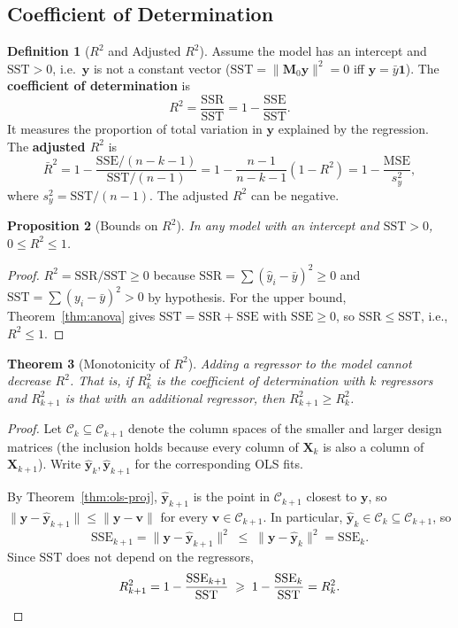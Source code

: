 \documentclass[14pt]{extarticle}
\theoremstyle{plain}
\newtheorem{theorem}{Theorem}[section]
\newtheorem{proposition}[theorem]{Proposition}
\theoremstyle{definition}
\newtheorem{definition}[theorem]{Definition}
\theoremstyle{remark}
\newcommand{\SST}{\mathrm{SST}}
\newcommand{\SSR}{\mathrm{SSR}}
\newcommand{\SSE}{\mathrm{SSE}}
\newcommand{\MSE}{\mathrm{MSE}}
\newcommand{\bX}{\mathbf{X}}
\newcommand{\by}{\mathbf{y}}
\newcommand{\bM}{\mathbf{M}}
\newcommand{\bone}{\mathbf{1}}
\newcommand{\bv}{\mathbf{v}}
\newcommand{\calC}{\mathcal{C}}
\begin{document}
\subsection{Coefficient of Determination}

\begin{definition}[$R^2$ and Adjusted $R^2$]\label{def:R2}
Assume the model has an intercept and $\SST > 0$, i.e.\ $\by$ is not a constant vector ($\SST = \|\bM_0\by\|^2 = 0$ iff $\by = \bar y\bone$). The \textbf{coefficient of determination} is
\begin{equation}
R^2 = \frac{\SSR}{\SST} = 1 - \frac{\SSE}{\SST}.
\end{equation}
It measures the proportion of total variation in $\by$ explained by the regression. The \textbf{adjusted $R^2$} is
\begin{equation}
\bar{R}^2 = 1 - \frac{\SSE/(n-k-1)}{\SST/(n-1)} = 1 - \frac{n-1}{n-k-1}(1 - R^2) = 1 - \frac{\MSE}{s_y^2},
\end{equation}
where $s_y^2 = \SST/(n-1)$. The adjusted $R^2$ can be negative.
\end{definition}

\begin{proposition}[Bounds on $R^2$]\label{prop:R2-bounds}
In any model with an intercept and $\SST > 0$, $0 \leqslant R^2 \leqslant 1$.
\end{proposition}

\begin{proof}
$R^2 = \SSR/\SST \geqslant 0$ because $\SSR = \sum(\hat{y}_i - \bar{y})^2 \geqslant 0$ and $\SST = \sum(y_i - \bar{y})^2 > 0$ by hypothesis. For the upper bound, Theorem~\ref{thm:anova} gives $\SST = \SSR + \SSE$ with $\SSE \geqslant 0$, so $\SSR \leqslant \SST$, i.e., $R^2 \leqslant 1$.
\end{proof}

\begin{theorem}[Monotonicity of $R^2$]\label{thm:R2-monotone}
Adding a regressor to the model cannot decrease $R^2$. That is, if $R^2_k$ is the coefficient of determination with $k$ regressors and $R^2_{k+1}$ is that with an additional regressor, then $R^2_{k+1} \geqslant R^2_k$.
\end{theorem}

\begin{proof}
Let $\calC_k \subseteq \calC_{k+1}$ denote the column spaces of the smaller and larger design matrices (the inclusion holds because every column of $\bX_k$ is also a column of $\bX_{k+1}$). Write $\hat{\by}_k, \hat{\by}_{k+1}$ for the corresponding OLS fits.

By Theorem~\ref{thm:ols-proj}, $\hat{\by}_{k+1}$ is the point in $\calC_{k+1}$ closest to $\by$, so $\|\by - \hat{\by}_{k+1}\| \leqslant \|\by - \bv\|$ for every $\bv \in \calC_{k+1}$. In particular, $\hat{\by}_k \in \calC_k \subseteq \calC_{k+1}$, so
\[
\SSE_{k+1} = \|\by - \hat{\by}_{k+1}\|^2 \;\leqslant\; \|\by - \hat{\by}_k\|^2 = \SSE_k.
\]
Since $\SST$ does not depend on the regressors,
\[
R^2_{k+1} = 1 - \frac{\SSE_{k+1}}{\SST} \;\geqslant\; 1 - \frac{\SSE_k}{\SST} = R^2_k. \qedhere
\]
\end{proof}
\end{document}
